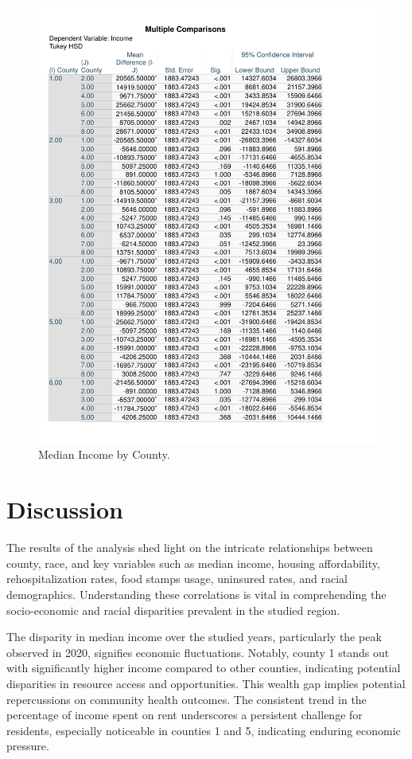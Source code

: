 \documentclass[12pt]{article}
\begin{document}
  \begin{figure}[tbp]
    \label{fig:Income by County Graph}
    \centering
    \includegraphics[width=\textwidth]{Income by County Graph.pdf}
    \caption{Median Income by County.}
  \end{figure}

\section{Discussion}\label{sec:disc}

The results of the analysis shed light on the intricate relationships between county, race, and key 
variables such as median income, housing affordability, rehospitalization rates, food stamps usage, 
uninsured rates, and racial demographics. Understanding these correlations is vital in comprehending 
the socio-economic and racial disparities prevalent in the studied region.

The disparity in median income over the studied years, particularly the peak observed in 2020, 
signifies economic fluctuations. Notably, county 1 stands out with significantly higher income 
compared to other counties, indicating potential disparities in resource access and opportunities. 
This wealth gap implies potential repercussions on community health outcomes. The consistent trend in 
the percentage of income spent on rent underscores a persistent challenge for residents, especially 
noticeable in counties 1 and 5, indicating enduring economic pressure.
\end{document}
